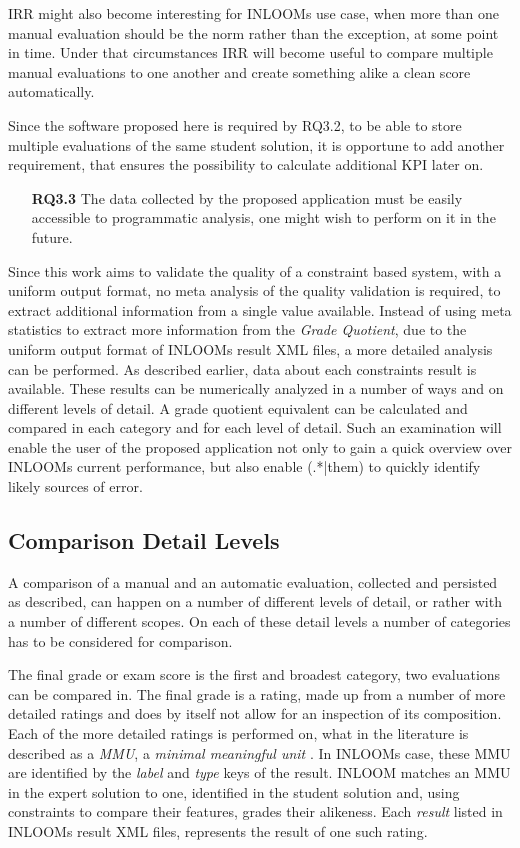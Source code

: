 IRR might also become interesting for INLOOMs use case, when more than one manual evaluation 
should be the norm rather than the exception, at some point in time. Under that circumstances 
IRR will become useful to compare multiple manual evaluations to one another and create 
something alike a clean score automatically.  

Since the software proposed here is required by RQ3.2, to be able to store multiple evaluations
of the same student solution, it is opportune to add another requirement, that ensures the 
possibility to calculate additional KPI later on.

\begin{itemize}
    \item[\textbf{RQ3.3}] The data collected by the proposed application must be easily 
    accessible to programmatic analysis, one might wish to perform on it in the future. 
\end{itemize}

Since this work aims to validate the quality of a constraint based system, with a uniform
output format, no meta analysis of the quality validation is required, to extract additional
information from a single value available. Instead of using meta statistics to extract more
information from the \textit{Grade Quotient}, due to the uniform output format of INLOOMs
result XML files, a more detailed analysis can be performed. As described earlier, data about
each constraints result is available. These results can be numerically analyzed in a number
of ways and on different levels of detail. A grade quotient equivalent can be calculated
and compared in each category and for each level of detail. Such an examination will enable 
the user of the proposed application not only to gain a quick overview over INLOOMs current
performance, but also enable (.*|them) to quickly identify likely sources of error. 



\subsection{Comparison Detail Levels}

A comparison of a manual and an automatic evaluation, collected and persisted as described, 
can happen on a number of different levels of detail, or rather with a number of different 
scopes. On each of these detail levels a number of categories has to be considered for 
comparison.

The final grade or exam score is the first and broadest category, two evaluations
can be compared in. The final grade is a rating, made up from a number of more detailed ratings
and does by itself not allow for an inspection of its composition. 
Each of the more detailed ratings is performed on, what in the literature is described as a 
\textit{MMU}, a \textit{minimal meaningful unit} \cite{28}. In INLOOMs case, these MMU are 
identified by the \textit{label} and \textit{type} keys of the result. INLOOM matches an MMU 
in the expert solution to one, identified in the student solution and, using constraints to 
compare their features, grades their alikeness. Each \textit{result} listed in INLOOMs result 
XML files, represents the result of one such rating. 

